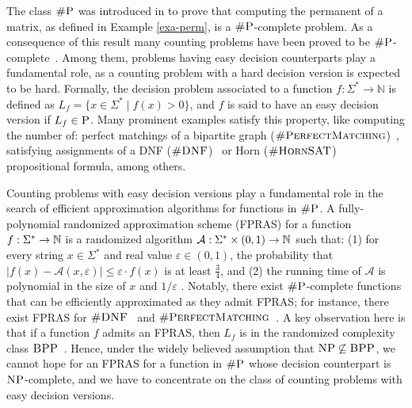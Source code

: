 
The class $\text{\sc \#P}$ was introduced in \cite{Valiant79} to prove that computing the permanent of a matrix, as defined in Example \ref{exa-perm}, is a $\text{\sc \#P}$-complete problem.
As a consequence of this result many counting problems have been proved to be $\text{\sc \#P}$-complete~\cite{V79b,arora2009computational}.
Among them, problems having easy decision counterparts play a fundamental role, as a counting problem with a hard decision version is expected to be hard. Formally, the decision problem associated to a function $f : \Sigma^* \to \mathbb{N}$ is defined as $L_f = \{ x \in \Sigma^* \mid f(x) > 0 \}$, and $f$ is said to have an easy decision version if $L_f \in \text{\sc P}$. 
Many prominent examples satisfy this property, like computing the number of: perfect matchings of a bipartite graph ($\textsc{\#PerfectMatching}$)~\cite{Valiant79}, satisfying assignments of a DNF ($\textsc{\#DNF}$)~\cite{DHK05,KL83} or Horn ($\textsc{\#HornSAT}$)~\cite{V79b} propositional formula, among others.

Counting problems with easy decision versions play a fundamental role in the search of efficient approximation algorithms for functions in $\text{\sc \#P}$. A fully-polynomial randomized approximation scheme (FPRAS) for a function $f : \Sigma^* \to \mathbb{N}$ is a randomized algorithm $\mathcal{A} : \Sigma^* \times (0,1) \to \mathbb{N}$ such that: (1) for every string $x \in \Sigma^*$ and real value $\varepsilon \in (0,1)$, the probability that $|f(x) - \mathcal{A}(x,\varepsilon)| \leq \varepsilon \cdot f(x)$ is at least $\frac{3}{4}$, and (2) the running time of $\mathcal{A}$ is polynomial in the size of $x$ and $1/\varepsilon$ \cite{KL83}. Notably, there exist $\text{\sc \#P}$-complete functions that can be efficiently approximated as they admit FPRAS; for instance, there exist FPRAS for $\textsc{\#DNF}$~\cite{KL83} and $\textsc{\#PerfectMatching}$~\cite{JSV04}. A key observation here is that if a function $f$ admits an FPRAS, then $L_f$ is in the randomized complexity class $\text{\sc BPP}$~\cite{G77}. Hence, under the widely believed assumption that  $\text{\sc NP} \not\subseteq \text{\sc BPP}$, we cannot hope for an FPRAS for a function in $\text{\sc \#P}$ whose decision counterpart is $\text{\sc NP}$-complete, and we have to concentrate on the class of counting problems with easy decision versions.

